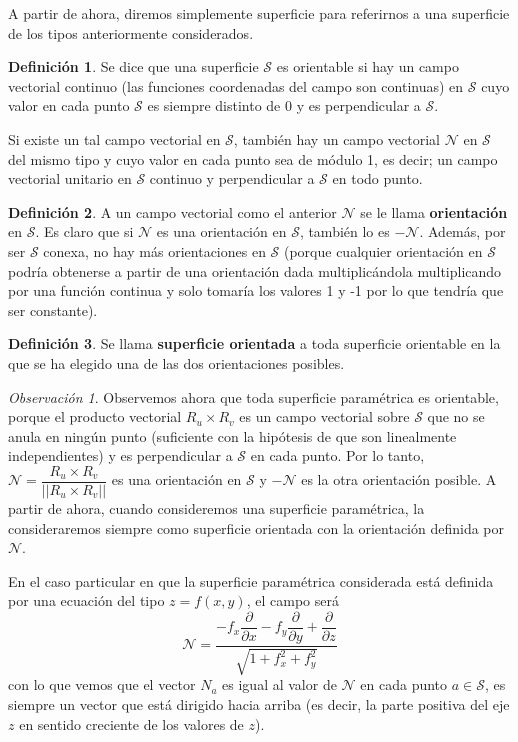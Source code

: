 \documentclass[12pt,twoside]{report}
\newcommand\mc[1]{\mathcal{#1}}
\theoremstyle{azul}
\theoremstyle{azul2}
\theoremstyle{plain}
\theoremstyle{definition}
\newtheorem{defin}{Definición}[chapter]
\theoremstyle{remark}
\newtheorem*{obs}{Observación}
\begin{document}
 A partir de ahora, diremos simplemente superficie para referirnos a una superficie de los tipos anteriormente considerados. \begin{defin}
 Se dice que una superficie $\mc{S}$ es orientable si hay un campo vectorial continuo  (las funciones coordenadas del campo son continuas) en $\mc{S}$ cuyo valor en cada punto $\mc{S}$ es siempre distinto de 0 y es perpendicular a $\mc{S}$.
 
 Si existe un tal campo vectorial en $\mc{S}$, también hay un campo vectorial $\mc{N}$ en $\mc{S}$ del mismo tipo y cuyo valor en cada punto sea de módulo 1, es decir; un campo vectorial unitario en $\mc{S}$ continuo y perpendicular a $\mc{S}$ en todo punto. 
 \end{defin}
 \begin{defin}
 A un campo vectorial como el anterior $\mc{N}$ se le llama \textbf{orientación} en $\mc{S}$. Es claro que si $\mc{N}$ es una orientación en $\mc{S}$, también lo es $- \mc{N}$. Además, por ser $\mc{S}$ conexa, no hay más orientaciones en $\mc{S}$ (porque cualquier orientación en $\mc{S}$ podría obtenerse a partir de una orientación dada multiplicándola multiplicando por una función continua y solo tomaría los valores 1 y -1 por lo que tendría que ser constante).  
 \end{defin}
 \begin{defin}
 Se llama \textbf{superficie orientada} a toda superficie orientable en la que se ha elegido una de las dos orientaciones posibles. 
 \end{defin}
\begin{obs}
Observemos ahora que toda superficie paramétrica es orientable, porque el producto vectorial $R_u \times R_v$ es un campo vectorial sobre $\mc{S}$ que no se anula en ningún punto (suficiente con la hipótesis de que son linealmente independientes) y es perpendicular a $\mc{S}$ en cada punto. Por lo tanto, $\mc{N}=\dfrac{R_u \times R_v}{||R_u \times R_v||}$ es una orientación en $\mc{S}$ y $- \mc{N}$ es la otra orientación posible. A partir de ahora, cuando consideremos una superficie paramétrica, la consideraremos siempre como superficie orientada con la orientación definida por $\mc{N}$.

En el caso particular en que la superficie paramétrica considerada está definida por una ecuación del tipo $z=f(x,y)$, el campo será
$$\mc{N}= \dfrac{-f_x \dfrac{\partial}{\partial x} -f_y \dfrac{\partial}{\partial y} + \dfrac{\partial}{\partial z}}{\sqrt{1 + f_x^2 +f_y^2}}$$
con lo que vemos que el vector $N_a$ es igual al valor de $\mc{N}$ en cada punto $a \in \mc{S}$, es siempre un vector que está dirigido hacia arriba (es decir, la parte positiva del eje $z$ en sentido creciente de los valores de $z$). 
\end{obs}
 
\end{document}

